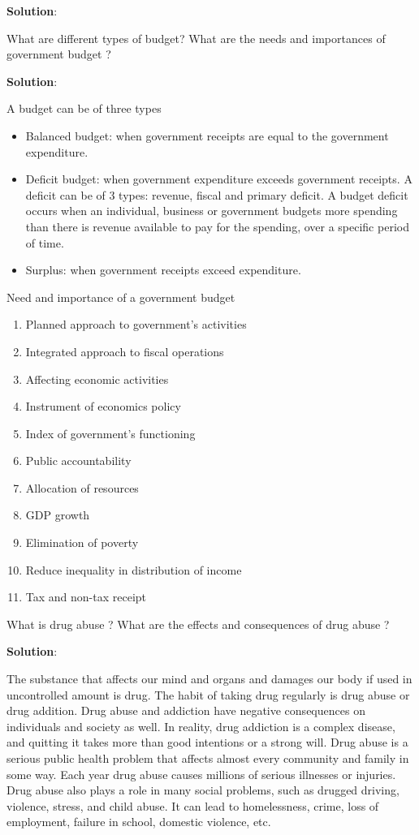 \documentclass[
  openany]{book}
\newcommand{\question}{\item}
\newenvironment{solution}{ {\bfseries Solution}:}{}
\begin{document}
\begin{questions}
\begin{solution}
\end{solution}

\question What are different types of budget? What are the needs and importances of government budget ?

\begin{solution}

A budget can be of three types
\begin{itemize}
\item Balanced budget: when government receipts are equal to the government expenditure.
\item Deficit budget: when government expenditure exceeds government receipts. A deficit can be of 3 types: revenue, fiscal and primary deficit. A budget deficit occurs when an individual, business or government budgets more spending than there is revenue available to pay for the spending, over a specific period of time.
\item Surplus: when government receipts exceed expenditure.
\end{itemize}

Need and importance of a government budget
\begin{enumerate}
\item Planned approach to government's activities
\item Integrated approach to fiscal operations
\item Affecting economic activities
\item Instrument of economics policy
\item Index of government's functioning
\item Public accountability
\item Allocation of resources
\item GDP growth
\item Elimination of poverty
\item Reduce inequality in distribution of income
\item Tax and non-tax receipt
\end{enumerate}

\end{solution}

\question What is drug abuse ? What are the effects and consequences of drug abuse ?

\begin{solution}

The substance that affects our mind and organs and damages our body if used in uncontrolled amount is drug. The habit of taking drug regularly is drug abuse or drug addition. Drug abuse and addiction have negative consequences on individuals and society as well. In reality, drug addiction is a complex disease, and quitting it takes more than good intentions or a strong will. Drug abuse is a serious public health problem that affects almost every community and family in some way. Each year drug abuse causes millions of serious illnesses or injuries. Drug abuse also plays a role in many social problems, such as drugged driving, violence, stress, and child abuse. It can lead to homelessness, crime, loss of employment, failure in school, domestic violence, etc.


\end{solution}
\end{questions}
\end{document}
